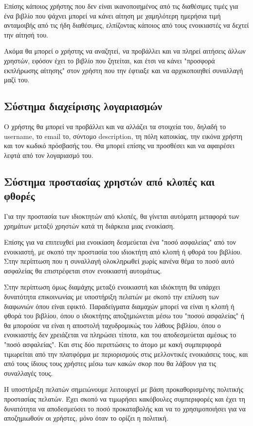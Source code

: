 \documentclass[12pt,a4paper]{article}
\begin{document}
Επίσης κάποιος χρήστης που δεν είναι ικανοποιημένος από τις διαθέσιμες τιμές για ένα βιβλίο που ψάχνει μπορεί να κάνει αίτηση με χαμηλότερη ημερήσια τιμή ανταμοιβής από τις ήδη διαθέσιμες, ελπίζοντας κάποιος από τους ενοικιαστές να δεχτεί την αίτησή του.

Ακόμα θα μπορεί ο χρήστης να αναζητεί, να προβάλλει και να πληρεί αιτήσεις άλλων χρηστών, εφόσον έχει το βιβλίο που ζητείται, και έτσι να κάνει "προσφορά εκπλήρωσης αίτησης" στον χρήστη που την έφτιαξε και να αρχικοποιηθεί συναλλαγή μαζί του.

\subsection{Σύστημα διαχείρισης λογαριασμών}
Ο χρήστης θα μπορεί να προβάλλει και να αλλάζει τα στοιχεία του, δηλαδή το username, το email το, σύντομο description, τη πόλη κατοικίας, την εικόνα χρήστη και τον κωδικό πρόσβασής του. Θα μπορεί επίσης να προσθέσει και να αφαιρέσει λεφτά από τον λογαριασμό του. 

\subsection{Σύστημα προστασίας χρηστών από κλοπές και φθορές}
Για την προστασία των ιδιοκτητών από κλοπές, θα γίνεται αυτόματη μεταφορά των χρημάτων μεταξύ χρηστών κατά τη διάρκεια μιας ενοικίαση. 

Επίσης για να επιτευχθεί μια ενοικίαση δεσμεύεται ένα "ποσό ασφαλείας" από τον ενοικιαστή, με σκοπό την προστασία του ιδιοκτήτη από κλοπή ή φθορά του βιβλίου. Στην περίπτωση που η συναλλαγή ολοκληρωθεί χωρίς κανένα θέμα το ποσό αυτό ασφαλείας θα επιστρέφεται στον ενοικιαστή αυτομάτως.

Στην περίπτωση όμως διαμάχης μεταξύ ενοικιαστή και ιδιόκτητη θα υπάρχει δυνατότητα επικοινωνίας με υποστήριξη πελατών με σκοπό την επίλυση των διαφωνιών όπου είναι εφικτό. Παραδείγματα διαμαχών μπορεί να είναι η κλοπή ή φθορά του βιβλίου, όπου ο ιδιοκτήτης αποζημιώνεται μέσω του "ποσού ασφαλείας" ή θα μπορούσε να είναι η αποστολή ταχυδρομικώς του λάθους βιβλίου, όπου ο ενοικιαστής δεν χρειάζεται να πληρώσει τίποτα, και του αποδεσμεύεται αμέσως το "ποσό ασφαλείας". Και στις δύο περιπτώσεις το άτομο με κακή συμπεριφορά τιμωρείται από την πλατφόρμα με περιορισμούς στις μελλοντικές ενοικιάσεις τους, και από τους ίδιους τους χρήστες μέσω των κακών σκορ που θα λάβουν για τις συναλλαγές τους.

Η υποστήριξη πελατών σημειώνουμε λειτουργεί με βάση προκαθορισμένης πολιτικής προστασίας πελατών. Έχει σκοπό να τιμωρήσει κακόβουλες συμπεριφορές και έχει τη δυνατότητα να αποδεσμεύσει το ποσό προκαταβολής και να το χρησιμοποιήσει για να αποζημιωθούν οι χρήστες, μόνο όταν το ορίζει η πολιτική.
\end{document}
